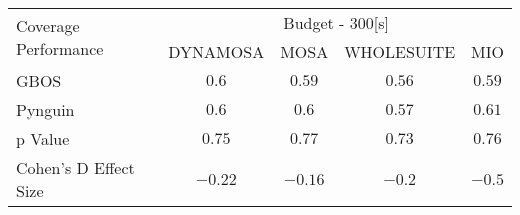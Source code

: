 \begin{tabular}{lcccc}\toprule 
\multirow{2}{*}{Coverage Performance} & \multicolumn{4}{c}{Budget - 300[s] } \\ \cmidrule(lr){2-5}  
                                      & DYNAMOSA&MOSA&WHOLESUITE&MIO                         \\ \midrule 
GBOS                                  & \(0.6\)&\(0.59\)&\(0.56\)&\(0.59\)                       \\ 
Pynguin                               & \(0.6\)&\(0.6\)&\(0.57\)&\(0.61\)                       \\ 
p Value                               & \(0.75\)&\(0.77\)&\(0.73\)&\(0.76\)                     \\ 
Cohen's D Effect Size                 & \(-0.22\)&\(-0.16\)&\(-0.2\)&\(-0.5\)                       \\ 
\bottomrule 
\end{tabular}